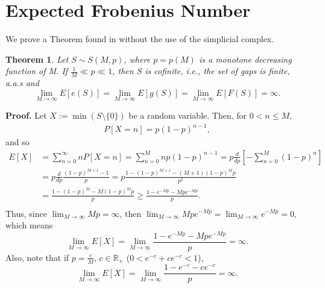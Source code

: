 \documentclass[12pt]{article}
\newtheorem{theorem}{Theorem}[section]
\theoremstyle{definition}
\theoremstyle{remark}
\begin{document}
\section{Expected Frobenius Number}

We prove a Theorem found in \cite{de2017random} without the use of the simplicial complex. 

\begin{theorem}
    Let $S \sim S(M, p)$, where $p = p(M)$ is a monotone decreasing function of M. If $\frac{1}{M} \ll p \ll 1$, then $S$ is cofinite, i.e., the set of gaps is finite, a.a.s and 
\[\lim_{M \to \infty} E[e(S)] = \lim_{M \to \infty} E[g(S)] = \lim_{M \to \infty} E[F(S)] = \infty.\]
\end{theorem}

\textbf{Proof. } Let $X := \min(S \setminus \{0\})$ be a random variable. Then, for $0 < n \leq M$,
\begin{align*}
    P[X = n] = p(1 - p)^{n - 1}, 
\end{align*}
and so 
\begin{align*}
    E[X] &= \sum_{n = 0}^{\infty} nP[X = n] =
    \sum_{n = 0}^{M} np(1 - p)^{n - 1} = p\frac{d}{dp}\left[-\sum_{n = 0}^{M}(1 - p)^n\right]\\
    &=p\frac{d}{dp} \frac{(1 - p)^{M + 1} - 1}{p} = p\frac{1 - (1 - p)^{M + 1} - (M  + 1)(1 - p)^Mp}{p^2} \\
    &= \frac{1 - (1 - p)^{M} - M(1 - p)^Mp}{p} \geq \frac{1 - e^{-Mp} - Mpe^{-Mp}}{p}. \\
\end{align*}
Thus, since $\lim_{M \to \infty} Mp = \infty$, then $\lim_{M \to \infty }Mpe^{-Mp} = \lim_{M \to \infty} e^{-Mp} = 0$, which means
\[\lim _{M \to \infty} E[X] = \lim_{M \to \infty} \frac{1 - e^{-Mp} - Mpe^{-Mp}}{p} = \infty.\]
Also, note that if $p = \frac{c}{M}$, $c \in \mathbb{R_+}$ ($0 < e^{-c} + ce^{-c} < 1$),
\[\lim _{M \to \infty} E[X] = \lim_{M \to \infty} \frac{1 - e^{-c} - ce^{-c}}{p} = \infty.\]



\end{document}
